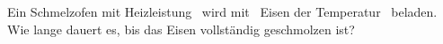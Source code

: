 Ein Schmelzofen mit Heizleistung \POO\ wird mit \mFeO\ Eisen der Temperatur \TaO\ beladen. Wie lange dauert es, bis das Eisen vollständig geschmolzen ist?
